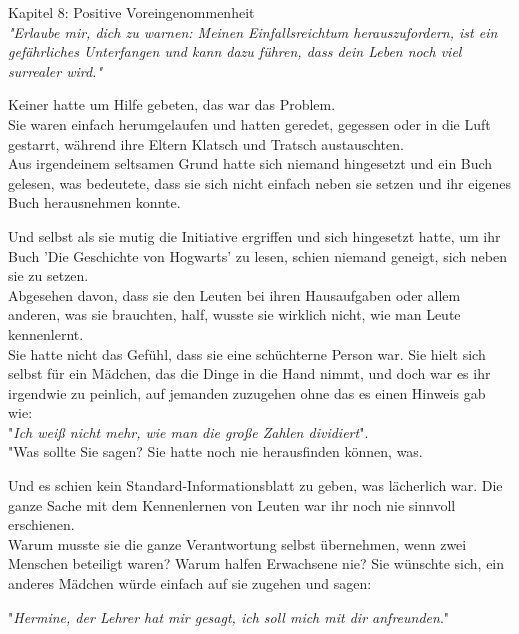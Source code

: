

\hypertarget{positive-voreingenommenheit}{%

Kapitel 8: Positive Voreingenommenheit\\ \emph{\hfill\break "Erlaube mir, dich zu warnen: Meinen Einfallsreichtum herauszufordern, ist ein gefährliches Unterfangen und kann dazu führen, dass dein Leben noch viel surrealer wird."}

Keiner hatte um Hilfe gebeten, das war das Problem.\\ Sie waren einfach herumgelaufen und hatten geredet, gegessen oder in die Luft gestarrt, während ihre Eltern Klatsch und Tratsch austauschten.\\ Aus irgendeinem seltsamen Grund hatte sich niemand hingesetzt und ein Buch gelesen, was bedeutete, dass sie sich nicht einfach neben sie setzen und ihr eigenes Buch herausnehmen konnte.

Und selbst als sie mutig die Initiative ergriffen und sich hingesetzt hatte, um ihr Buch 'Die Geschichte von Hogwarts' zu lesen, schien niemand geneigt, sich neben sie zu setzen.\\ Abgesehen davon, dass sie den Leuten bei ihren Hausaufgaben oder allem anderen, was sie brauchten, half, wusste sie wirklich nicht, wie man Leute kennenlernt.\\ Sie hatte nicht das Gefühl, dass sie eine schüchterne Person war. Sie hielt sich selbst für ein Mädchen, das die Dinge in die Hand nimmt, und doch war es ihr irgendwie zu peinlich, auf jemanden zuzugehen ohne das es einen Hinweis gab wie:\\ "\emph{Ich weiß nicht mehr, wie man die große Zahlen dividiert}".\\ "Was sollte Sie sagen? Sie hatte noch nie herausfinden können, was.

Und es schien kein Standard-Informationsblatt zu geben, was lächerlich war. Die ganze Sache mit dem Kennenlernen von Leuten war ihr noch nie sinnvoll erschienen.\\ Warum musste sie die ganze Verantwortung selbst übernehmen, wenn zwei Menschen beteiligt waren? Warum halfen Erwachsene nie? Sie wünschte sich, ein anderes Mädchen würde einfach auf sie zugehen und sagen:

"\emph{Hermine, der Lehrer hat mir gesagt, ich soll mich mit dir anfreunden}."

}
